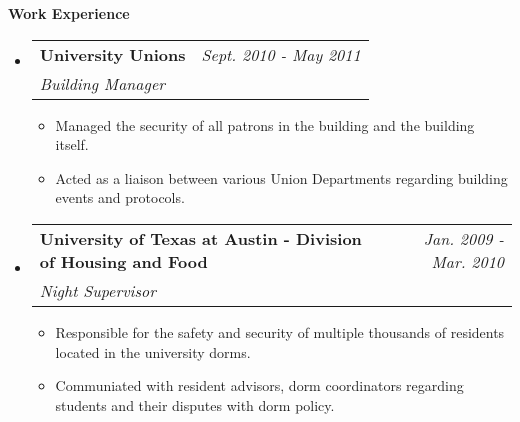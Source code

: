 \documentclass[letterpaper,10pt]{article}
\makeatletter
\newcommand{\resheading}[1]{{\Large \colorbox{mygrey}{\begin{minipage}{\textwidth}{\textbf{#1 \vphantom{p\^{E}}}}\end{minipage}}}}
\newcommand{\workheading}[3]{
\begin{tabular*}{6.5in}{l@{\extracolsep{\fill}}r}
		\textbf{#1} & \textit{#3} \\
		\textit{#2}
\end{tabular*}\vspace{6pt}}
\makeatother
\begin{document}
\resheading{Work Experience}
	\begin{itemize}
	 \item
	    \workheading{University Unions}{Building Manager}{Sept. 2010 - May 2011}
	      { \begin{itemize}\vspace{-10pt}
	        \item{Managed the security of all patrons in the building and the building itself.}
	        \item{Acted as a liaison between various Union Departments regarding building events and protocols.}
	        \end{itemize}
	      }

	 \item
	    \workheading{University of Texas at Austin - Division of Housing and Food}{Night Supervisor}{Jan. 2009 - Mar. 2010}
	      { \begin{itemize}\vspace{-10pt}
	         \item{Responsible for the safety and security of multiple thousands of residents located in the university dorms.}
		 \item{Communiated with resident advisors, dorm coordinators regarding students and their disputes with dorm policy.}
	        \end{itemize}
	      }
	\end{itemize} %
\end{document}
